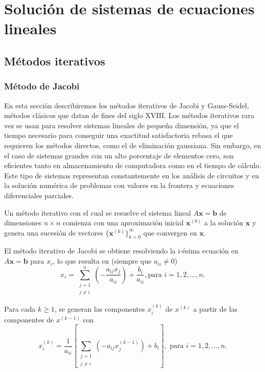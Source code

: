 \chapter{Solución de sistemas de ecuaciones lineales}

\section{Métodos iterativos}

\subsection{Método de Jacobi}

En esta sección describiremos los métodos iterativos de Jacobi y Gauss-Seidel, métodos clásicos que datan de fines del siglo XVIII. Los métodos
iterativos rara vez se usan para resolver sistemas lineales de pequeña dimensión, ya que el tiempo necesario para conseguir una exactitud satisfactoria
rebasa el que requieren los métodos directos, como el  de eliminación gaussiana. Sin embargo, en el caso de sistemas grandes con un alto porcentaje de 
elementos cero, son eficientes tanto en almacenamiento de computadora como en el tiempo de cálculo. Este tipo de sistemas representan constantemente
en los análisis de circuitos y en la solución numérica de problemas con valores en la frontera y ecuaciones diferenciales parciales.

Un método iterativo con el cual se resuelve el sistema lineal $A\textbf{x}=\textbf{b}$ de dimensiones $n\times n$ comienza con una aproximación inicial $\textbf{x}^{(0)}$ a la
solución $\textbf{x}$ y genera una sucesión de vectores $\{\textbf{x}^{(k)}\}^\infty_{k=0}$ que convergen en $\textbf{x}$.

El método iterativo de Jacobi se obtiene resolviendo la i-ésima ecuación en $A\textbf{x}=\textbf{b}$ para $x_i$, lo que resulta en (siempre que $a_{ii}\not=0$)
\begin{equation*}
  x_i = \sum_{\substack{j=1\\j\not= i}}^n \left(-\frac{a_{ij}x_j}{a_{ii}} \right) + \frac{b_i}{a_{ii}}, \mbox{para } i=1,2,\dots ,n.
\end{equation*}

Para cada $k\geq 1$, se generan las componentes $x_i^{(k)}$ de $x^{(k)}$ a partir de las componentes de $x^{(k-1)}$ con
\begin{equation}
  x_i^{(k)} = \frac{1}{a_{ii}}\left[\sum_{\substack{j=1\\j\not= i}}\left( -a_{ij}x_j^{(k-1)}\right) +b_i\right], \mbox{ para } i=1,2,\dots,n.
  \label{eq:jacobi1}
\end{equation}

